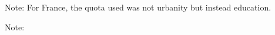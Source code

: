 \documentclass{article}
\begin{document}
\begin{table}[h!]
	\caption{Sample Characteristics -- All Countries}
	\begin{center}
		\scalebox{0.62}{}
	\end{center}
	{\footnotesize Note: For France, the quota used was not urbanity but instead education.
	\newline }
\end{table}	


\begin{table}[h!]
	\caption{Sample Characteristics -- France}
	\begin{center}
		\scalebox{0.7}{}
	\end{center}
	{\footnotesize Note: 
	\newline }
\end{table}	
\end{document}
